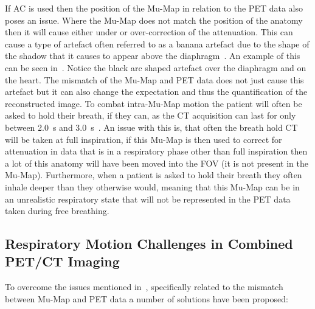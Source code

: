             If \gls{AC} is used then the position of the \gls{Mu-Map} in relation to the \gls{PET} data also poses an issue. Where the \gls{Mu-Map} does not match the position of the anatomy then it will cause either under or over-correction of the attenuation. This can cause a type of artefact often referred to as a banana artefact due to the shape of the shadow that it causes to appear above the diaphragm~. An example of this can be seen in~. Notice the black arc shaped artefact over the diaphragm and on the heart. The mismatch of the \gls{Mu-Map} and \gls{PET} data does not just cause this artefact but it can also change the expectation and thus the quantification of the reconstructed image. To combat intra-\gls{Mu-Map} motion the patient will often be asked to hold their breath, if they can, as the \gls{CT} acquisition can last for only between \SI{2.0}{\second} and \SI{3.0}{\second}~. An issue with this is, that often the breath hold \gls{CT} will be taken at full inspiration, if this \gls{Mu-Map} is then used to correct for attenuation in data that is in a respiratory phase other than full inspiration then a lot of this anatomy will have been moved into the \gls{FOV} (it is not present in the \gls{Mu-Map}). Furthermore, when a patient is asked to hold their breath they often inhale deeper than they otherwise would, meaning that this \gls{Mu-Map} can be in an unrealistic respiratory state that will not be represented in the \gls{PET} data taken during free breathing. %
            
        \subsection{Respiratory Motion Challenges in Combined PET/CT Imaging} \label{sec:respiratory_motion_challenges_in_combined_pet_ct_imaging}
            To overcome the issues mentioned in~, specifically related to the mismatch between \gls{Mu-Map} and \gls{PET} data a number of solutions have been proposed:
            
